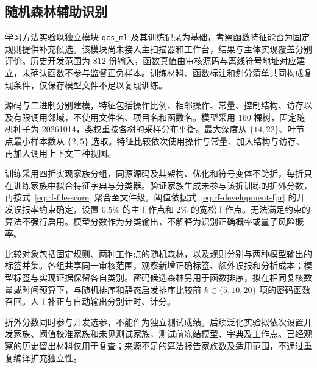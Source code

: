 \subsection{随机森林辅助识别}
\label{subsec:rf-experiment}

学习方法实验以独立模块 \texttt{qcs\_ml} 及其训练记录为基础，考察函数特征能否为固定规则提供补充候选。该模块尚未接入主扫描器和工作台，结果与主体实现覆盖分别评价。历史开发范围为 812 份输入，函数真值由审核源码与离线符号地址对应建立，未确认函数不参与监督正负样本。训练材料、函数标注和划分清单共同构成复现条件，仅保存模型文件不足以复现训练。

源码与二进制分别建模，特征包括操作比例、相邻操作、常量、控制结构、访存以及有限调用邻域，不使用文件名、项目名和函数名。模型采用 160 棵树，固定随机种子为 20261014，类权重按各树的采样分布平衡。最大深度从 $\{14,22\}$、叶节点最小样本数从 $\{2,5\}$ 选取。特征比较依次使用操作与常量、加入结构与访存、再加入调用上下文三种视图。

训练采用四折实现家族分组，同源源码及其架构、优化和符号变体不跨折，每折只在训练家族中拟合特征字典与分类器。验证家族生成未参与该折训练的折外分数，再按式~\eqref{eq:rf-file-score} 聚合至文件级。阈值依据式~\eqref{eq:rf-development-fpr} 的开发误报率约束确定，设置 $0.5\%$ 的主工作点和 $2\%$ 的宽松工作点。无法满足约束的算法不强行启用。模型分数作为分类输出，不解释为识别正确概率或量子风险概率。

比较对象包括固定规则、两种工作点的随机森林，以及规则分别与两种模型输出的标签并集。各组共享同一审核范围，观察新增正确标签、额外误报和分析成本；模型标签与实现证据保留各自类别。密码候选森林另用于函数排序，拟在相同复核数量或时间预算下，与随机排序和静态启发排序比较前 $k\in\{5,10,20\}$ 项的密码函数召回。人工补正与自动输出分别计时、计分。

折外分数同时参与开发选参，不能作为独立测试成绩。后续泛化实验拟依次设置开发家族、阈值校准家族和未见测试家族，测试前冻结模型、字典及工作点。已经观察的历史留出材料仅用于复查；来源不足的算法报告家族数及适用范围，不通过重复编译扩充独立性。


